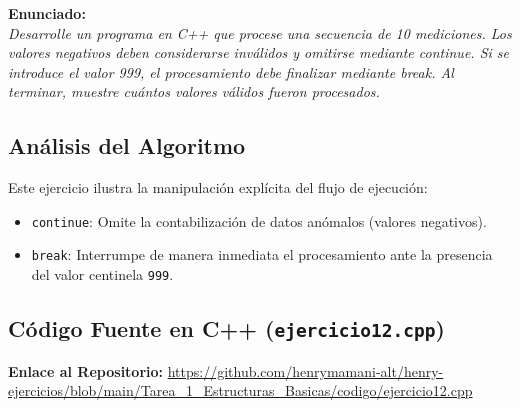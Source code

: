 \documentclass[12pt]{article}
\begin{document}
\noindent\textbf{Enunciado:}\\
\textit{Desarrolle un programa en C++ que procese una secuencia de 10 mediciones. Los valores negativos deben considerarse inválidos y omitirse mediante continue. Si se introduce el valor 999, el procesamiento debe finalizar mediante break. Al terminar, muestre cuántos valores válidos fueron procesados.}

\subsection*{Análisis del Algoritmo}
Este ejercicio ilustra la manipulación explícita del flujo de ejecución:
\begin{itemize}
    \item \texttt{continue}: Omite la contabilización de datos anómalos (valores negativos).
    \item \texttt{break}: Interrumpe de manera inmediata el procesamiento ante la presencia del valor centinela \texttt{999}.
\end{itemize}

\subsection*{Código Fuente en C++ (\texttt{ejercicio12.cpp})}
\noindent\textbf{Enlace al Repositorio:} \url{https://github.com/henrymamani-alt/henry-ejercicios/blob/main/Tarea_1_Estructuras_Basicas/codigo/ejercicio12.cpp}
\end{document}
